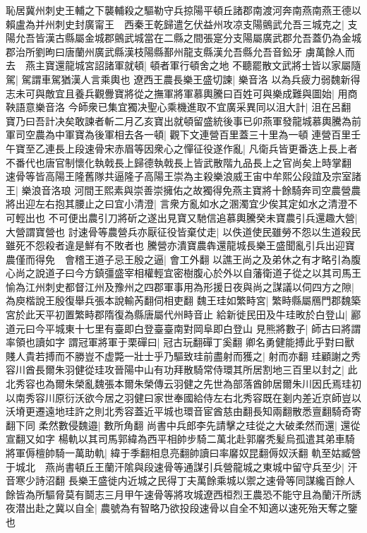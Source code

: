 恥居冀州刺史王輔之下襲輔殺之驅勒守兵掠陽平頓丘諸郡南渡河奔南燕南燕王德以賴盧為并州刺史封廣甯王　西秦王乾歸遣乞伏益州攻凉支陽鸇武允吾三城克之|{
	支陽允吾皆漢古縣屬金城郡鸇武城當在二縣之間張寔分支陽屬廣武郡允吾蓋仍為金城郡治所劉昫曰唐蘭州廣武縣漢枝陽縣鄯州龍支縣漢允吾縣允吾音鈆牙}
虜萬餘人而去　燕主寶還龍城宮詔諸軍就頓|{
	頓者軍行頓舍之地}
不聽罷散文武將士皆以家屬隨駕|{
	駕謂車駕猶漢人言乘輿也}
遼西王農長樂王盛切諫|{
	樂音洛}
以為兵疲力弱魏新得志未可與敵宜且養兵觀釁寶將從之撫軍將軍慕輿騰曰百姓可與樂成難與圖始|{
	用商鞅語意樂音洛}
今師衆已集宜獨决聖心乘機進取不宜廣采異同以沮大計|{
	沮在呂翻}
寶乃曰吾計决矣敢諫者斬二月乙亥寶出就頓留盛統後事已卯燕軍發龍城慕輿騰為前軍司空農為中軍寶為後軍相去各一頓|{
	觀下文連營百里蓋三十里為一頓}
連營百里壬午寶至乙連長上段速骨宋赤眉等因衆心之憚征役遂作亂|{
	凡衛兵皆更番迭上長上者不番代也唐官制懷化執戟長上歸德執戟長上皆武散階九品長上之官尚矣上時掌翻}
速骨等皆高陽王隆舊隊共逼隆子高陽王崇為主殺樂浪威王宙中牟熙公段誼及宗室諸王|{
	樂浪音洛琅}
河間王熙素與崇善崇擁佑之故獨得免燕主寶將十餘騎奔司空農營農將出迎左右抱其腰止之曰宜小清澄|{
	言衆方亂如水之溷濁宜少俟其定如水之清澄不可輕出也}
不可便出農引刀將斫之遂出見寶又馳信追慕輿騰癸未寶農引兵還趣大營|{
	大營謂寶營也}
討速骨等農營兵亦厭征役皆棄仗走|{
	以佚道使民雖勞不怨以生道殺民雖死不怨殺者違是鮮有不敗者也}
騰營亦潰寶農犇還龍城長樂王盛聞亂引兵出迎寶農僅而得免　會稽王道子忌王殷之逼|{
	會工外翻}
以譙王尚之及弟休之有才略引為腹心尚之說道子曰今方鎮彊盛宰相權輕宜密樹腹心於外以自藩衛道子從之以其司馬王愉為江州刺史都督江州及豫州之四郡軍事用為形援日夜與尚之謀議以伺四方之隙|{
	為庾楷說王殷復舉兵張本說輸芮翻伺相吏翻}
魏王珪如繁畤宮|{
	繁畤縣屬鴈門郡魏築宮於此天平初置繁畤郡隋復為縣唐屬代州畤音止}
給新徙民田及牛珪畋於白登山|{
	酈道元曰今平城東十七里有臺即白登臺臺南對岡阜即白登山}
見熊將數子|{
	師古曰將謂率領也讀如字}
謂冠軍將軍于栗磾曰|{
	冠古玩翻磾丁奚翻}
卿名勇健能搏此乎對曰獸賤人貴若搏而不勝豈不虚斃一壯士乎乃驅致珪前盡射而獲之|{
	射而亦翻}
珪顧謝之秀容川酋長爾朱羽健從珪攻晉陽中山有功拜散騎常侍環其所居割地三百里以封之|{
	此北秀容也為爾朱榮亂魏張本爾朱榮傳云羽健之先世為部落酋帥居爾朱川因氏焉珪初以南秀容川原衍沃欲今居之羽健曰家世奉國給侍左右北秀容既在剗内差近京師豈以沃塉更遷遠地珪許之則北秀容蓋近平城也環音宦酋慈由翻長知兩翻散悉亶翻騎奇寄翻下同}
柔然數侵魏邉|{
	數所角翻}
尚書中兵郎李先請擊之珪從之大破柔然而還|{
	還從宣翻又如字}
楊軌以其司馬郭緯為西平相帥步騎二萬北赴郭黁秃髪烏孤遣其弟車騎將軍傉檀帥騎一萬助軌|{
	緯于季翻相息亮翻帥讀曰率黁奴昆翻傉奴沃翻}
軌至姑臧營于城北　燕尚書頓丘王蘭汗隂與段速骨等通謀引兵營龍城之東城中留守兵至少|{
	汗音寒少詩沼翻}
長樂王盛徙内近城之民得丁夫萬餘乘城以禦之速骨等同謀纔百餘人餘皆為所驅脅莫有鬬志三月甲午速骨等將攻城遼西桓烈王農恐不能守且為蘭汗所誘夜潜出赴之冀以自全|{
	農號為有智略乃欲投段速骨以自全不知適以速死殆天奪之鑒也}
